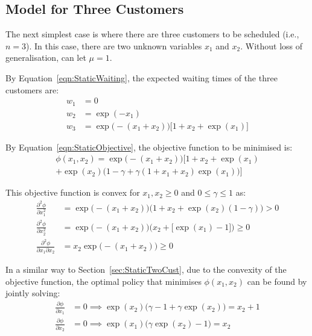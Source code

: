 \subsection{Model for Three Customers}

The next simplest case is where there are three customers to be scheduled (i.e., $n = 3$). In this case, there are two unknown variables $x_{1}$ and $x_{2}$. Without loss of generalisation, can let $\mu = 1$.

By Equation~\ref{eqn:StaticWaiting}, the expected waiting times of the three customers are:
\begin{align}
	w_{1} & = 0 \\
	w_{2} & = \exp (- x_{1}) \\
	w_{3} & = \exp \Big( - (x_{1} + x_{2}) \Big) \Big[ 1 + x_{2} + \exp (x_{1}) \Big]
\end{align}

By Equation~\ref{eqn:StaticObjective}, the objective function to be minimised is:
\begin{multline}
	\phi (x_{1}, x_{2}) = \exp \Big( - (x_{1} + x_{2}) \Big) \Bigg[ 1 + x_{2} + \exp (x_{1}) \\
	+ \exp (x_{2}) \Big( 1 - \gamma + \gamma (1 + x_{1} + x_{2}) \exp (x_{1}) \Big) \Bigg]
\end{multline}

This objective function is convex for $x_{1}, x_{2} \geq 0$ and $0 \leq \gamma \leq 1$ as:
\begin{align}
	\frac{\partial^{2} \phi}{\partial x_{1}^{2}} & = \exp \Big( - (x_{1} + x_{2}) \Big) \Big( 1 + x_{2} + \exp (x_{2}) (1 - \gamma) \Big) > 0 \\
	\frac{\partial^{2} \phi}{\partial x_{2}^{2}} & = \exp \Big( - (x_{1} + x_{2}) \Big) \Big( x_{2} + \big[ \exp (x_{1}) - 1 \big] \Big) \geq 0 \\
	\frac{\partial^{2} \phi}{\partial x_{1} \partial x_{2}} & = x_{2} \exp \Big( - (x_{1} + x_{2}) \Big) \geq 0
\end{align}

In a similar way to Section~\ref{sec:StaticTwoCust}, due to the convexity of the objective function, the optimal policy that minimises $\phi (x_{1}, x_{2})$ can be found by jointly solving:
\begin{align}
	\frac{\partial \phi}{\partial x_{1}} & = 0 \implies \exp (x_{2}) \Big( \gamma - 1 + \gamma \exp (x_{2}) \Big) = x_{2} + 1 \\
	\frac{\partial \phi}{\partial x_{2}} & = 0 \implies \exp (x_{1}) \Big( \gamma \exp (x_{2}) - 1 \Big) = x_{2}
\end{align}


